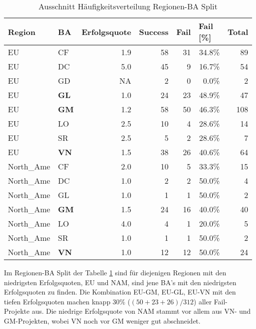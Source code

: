 \begin{table}[H]
	\centering
	\caption{Ausschnitt Häufigkeitsverteilung Regionen-BA Split}
	\begin{tabular}{llrrrrr}
		\textbf{Region} & \textbf{BA}    & \multicolumn{1}{l}{\textbf{Erfolgsquote}} & \multicolumn{1}{l}{\textbf{Success}} & \multicolumn{1}{l}{\textbf{Fail}} & \multicolumn{1}{l}{\textbf{Fail [\%]}} & \multicolumn{1}{l}{\textbf{Total}} \\\hline
		EU    & CF    & 1.9   & 58    & 31    & 34.8\% & 89 \\
		EU    & DC    & 5.0   & 45    & 9     & 16.7\% & 54 \\
		EU    & GD    & NA    & 2     & 0     & 0.0\% & 2 \\
		EU    & \textbf{GL}    & 1.0   & 24    & 23    & 48.9\% & 47 \\
		EU    & \textbf{GM}  & 1.2   & 58    & 50    & 46.3\% & 108 \\
		EU    & LO    & 2.5   & 10    & 4     & 28.6\% & 14 \\
		EU    & SR    & 2.5   & 5     & 2     & 28.6\% & 7 \\
		EU    & \textbf{VN}     & 1.5   & 38    & 26    & 40.6\% & 64 \\\hline
		North\_Ame & CF    & 2.0   & 10    & 5     & 33.3\% & 15 \\
		North\_Ame & DC    & 1.0   & 2     & 2     & 50.0\% & 4 \\
		North\_Ame & GL    & 1.0   & 1     & 1     & 50.0\% & 2 \\
		North\_Ame & \textbf{GM}   & 1.5   & 24    & 16    & 40.0\% & 40 \\
		North\_Ame & LO    & 4.0   & 4     & 1     & 20.0\% & 5 \\
		North\_Ame & SR    & 1.0   & 1     & 1     & 50.0\% & 2 \\
		North\_Ame & \textbf{VN}  & 1.0   & 12    & 12    & 50.0\% & 24 \\
	\end{tabular}%
	\label{fregba}%
\end{table}%
Im Regionen-BA Split der Tabelle \ref{fregba} sind für diejenigen Regionen mit den niedrigsten Erfolgsquoten, EU und NAM, sind jene BA's mit den niedrigsten Erfolgsquoten zu finden. Die Kombination EU-GM, EU-GL, EU-VN mit den tiefen Erfolgsquoten machen knapp 30\% ($(50+23+26)/312$) aller Fail-Projekte aus. Die niedrige Erfolgsquote von NAM stammt vor allem aus VN- und GM-Projekten, wobei VN noch vor GM weniger gut abschneidet.
\newline
